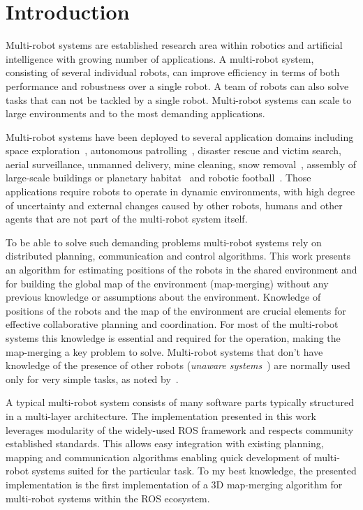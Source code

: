 \chapter*{Introduction}

Multi-robot systems are established research area within robotics and artificial intelligence with growing number of applications. A multi-robot system, consisting of several individual robots, can improve efficiency in terms of both performance and robustness over a single robot. A team of robots can also solve tasks that can not be tackled by a single robot. Multi-robot systems can scale to large environments and to the most demanding applications.

Multi-robot systems have been deployed to several application domains including space exploration~\citep{goldberg2002distributedspace,huntsberger2003campout}, autonomous patrolling~\citep{parker2003parolling100}, disaster rescue and victim search, aerial surveillance, unmanned delivery, mine cleaning, snow removal~\citep{choset2001coverage}, assembly of large-scale buildings or planetary habitat~\citep{goldberg2002distributedspace} and robotic football~\citep{asada1999robocup}. Those applications require robots to operate in  dynamic environments, with high degree of uncertainty and external changes caused by other robots, humans and other agents that are not part of the multi-robot system itself.

To be able to solve such demanding problems multi-robot systems rely on distributed planning, communication and control algorithms. This work presents an algorithm for estimating positions of the robots in the shared environment and for building the global map of the environment (map-merging) without any previous knowledge or assumptions about the environment. Knowledge of positions of the robots and the map of the environment are crucial elements for effective collaborative planning and coordination. For most of the multi-robot systems this knowledge is essential and required for the operation, making the map-merging a key problem to solve. Multi-robot systems that don't have knowledge of the presence of other robots (\textit{unaware systems}~\citep{farinelli2004multirobot}) are normally used only for very simple tasks, as noted by~\citet{farinelli2004multirobot}.

A typical multi-robot system consists of many software parts typically structured in a multi-layer architecture. The implementation presented in this work leverages modularity of the widely-used \gls{ROS} framework and respects community established standards. This allows easy integration with existing planning, mapping and communication algorithms enabling quick development of multi-robot systems suited for the particular task. To my best knowledge, the presented implementation is the first implementation of a \gls{3D} map-merging algorithm for multi-robot systems within the \gls{ROS} ecosystem.

